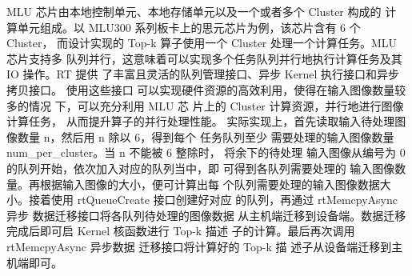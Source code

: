 MLU 芯片由本地控制单元、本地存储单元以及一个或者多个 Cluster 构成的 计
算单元组成。以 MLU300 系列板卡上的思元芯片为例，该芯片含有 6 个 Cluster，
 而设计实现的 Top-k 算子使用一个 Cluster 处理一个计算任务。MLU 芯片支持多 
 队列并行，这意味着可以实现多个任务队列并行地执行计算任务及其 IO 操作。RT 提供
 了丰富且灵活的队列管理接口、异步 Kernel 执行接口和异步拷贝接口。 使用这些接口
 可以实现硬件资源的高效利用，使得在输入图像数量较多的情况 下，可以充分利用 MLU 芯
 片上的 Cluster 计算资源，并行地进行图像计算任务， 从而提升算子的并行处理性能。
  实际实现上，首先读取输入待处理图像数量 n，然后用 n 除以 6，得到每个 任务队列至少
  需要处理的输入图像数量 num\_per\_cluster。当 n 不能被 6 整除时， 将余下的待处理
  输入图像从编号为 0 的队列开始，依次加入对应的队列当中，即 可得到各队列需要处理的
  输入图像数量。再根据输入图像的大小，便可计算出每 个队列需要处理的输入图像数据大
  小。接着使用 rtQueueCreate 接口创建好对应 的队列，再通过 rtMemcpyAsync 异步
  数据迁移接口将各队列待处理的图像数据 从主机端迁移到设备端。数据迁移完成后即可启
   Kernel 核函数进行 Top-k 描述 子的计算。最后再次调用 rtMemcpyAsync 异步数据
   迁移接口将计算好的 Top-k 描 述子从设备端迁移到主机端即可。





